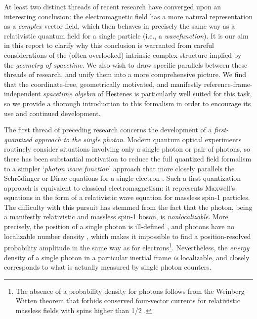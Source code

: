 \documentclass[1p,sort&compress]{elsarticle}
\numberwithin{equation}{section}
\begin{document}

At least two distinct threads of recent research have converged upon an interesting conclusion: the electromagnetic field has a more natural representation as a \emph{complex} vector field, which then behaves in precisely the same way as a relativistic quantum field for a single particle (i.e., a \emph{wavefunction}).  It is our aim in this report to clarify why this conclusion is warranted from careful considerations of the (often overlooked) intrinsic complex structure implied by the \emph{geometry of spacetime}.  We also wish to draw specific parallels between these threads of research, and unify them into a more comprehensive picture.  We find that the coordinate-free, geometrically motivated, and manifestly reference-frame-independent \emph{spacetime algebra} of Hestenes \cite{Hestenes1966,Hestenes1987,Hestenes2003,Hestenes2003b,Hestenes2005,Doran2007} is particularly well suited for this task, so we provide a thorough introduction to this formalism in order to encourage its use and continued development.

The first thread of preceding research concerns the development of a \emph{first-quantized approach to the single photon}.  Modern quantum optical experiments routinely consider situations involving only a single photon or pair of photons, so there has been substantial motivation to reduce the full quantized field formalism to a simpler `\emph{photon wave function}' approach that more closely parallels the Schr\"odinger or Dirac equations for a single electron \cite{Laporte1931,Oppenheimer1931,Mignani1974,Archibald1955,Good1957,Giannetto1985,Fushchich1987,Berry1990,Bialynicki-Birula1994,Bialynicki-Birula1996,Sipe1995,Esposito1998,Stepanovsky1998,Kobe1999,Gersten2001,Smith2006,Smith2007,Dragoman2007,Tamburini2008,Thide2011,
Barnett2014,Thide2014}. Such a first-quantization approach is equivalent to classical electromagnetism: it represents Maxwell's equations in the form of a relativistic wave equation for massless spin-1 particles.  The difficulty with this pursuit has stemmed from the fact that the photon, being a manifestly relativistic and massless spin-1 boson, is \emph{nonlocalizable}. More precisely, the position of a single photon is ill-defined \cite{Pryce1948,Newton1949,Wightman1962,Skagerstam1992,Keller2005,Bacry1988}, and photons have no localizable number density \cite{Bialynicki-Birula1996,Sipe1995,Smith2007,Keller2005}, which makes it impossible to find a position-resolved probability amplitude in the same way as for electrons\footnote{The absence of a probability density for photons follows from the Weinberg--Witten theorem \cite{Weinberg1980} that forbids conserved four-vector currents for relativistic massless fields with spins higher than 1/2 \cite{Stepanovsky1998,Smith2007}.}. Nevertheless, the \emph{energy} density of a single photon in a particular inertial frame \emph{is} localizable, and closely corresponds to what is actually measured by single photon counters.  
\end{document}
